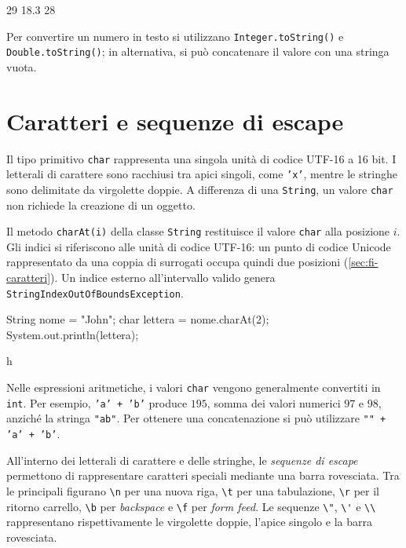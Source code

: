 \begin{unipdterminal}
29
18.3
28
\end{unipdterminal}

Per convertire un numero in testo si utilizzano
\texttt{Integer.toString()} e
\texttt{Double.toString()}; in alternativa,
si può concatenare il valore con una stringa vuota.

\clearpage

\section{Caratteri e sequenze di escape}
\label{sec:fi-java-char-escape}

Il tipo primitivo \texttt{char} rappresenta una singola
unità di codice UTF-16 a 16 bit. I letterali di carattere
sono racchiusi tra apici singoli, come \texttt{'x'},
mentre le stringhe sono delimitate da virgolette doppie.
A differenza di una \texttt{String}, un valore
\texttt{char} non richiede la creazione di un oggetto.

Il metodo \texttt{charAt(i)} della classe \texttt{String}
restituisce il valore \texttt{char} alla posizione \(i\).
Gli indici si riferiscono alle unità di codice UTF-16: un punto di codice Unicode
rappresentato da una coppia di surrogati occupa quindi
due posizioni (\cref{sec:fi-caratteri}).
Un indice esterno all'intervallo valido genera
\texttt{StringIndexOutOfBoundsException}.

\begin{unipdcode}[language=Java]
String nome = "John";
char lettera = nome.charAt(2);
System.out.println(lettera);
\end{unipdcode}

\begin{unipdterminal}
h
\end{unipdterminal}

Nelle espressioni aritmetiche, i valori \texttt{char}
vengono generalmente convertiti in \texttt{int}.
Per esempio, \texttt{'a' + 'b'} produce \(195\),
somma dei valori numerici \(97\) e \(98\),
anziché la stringa \texttt{"ab"}. Per ottenere
una concatenazione si può utilizzare
\texttt{"" + 'a' + 'b'}.

All'interno dei letterali di carattere e delle stringhe,
le \emph{sequenze di escape} permettono di rappresentare
caratteri speciali mediante una barra rovesciata.
Tra le principali figurano \lstinline|\n| per una
nuova riga, \lstinline|\t| per una tabulazione,
\lstinline|\r| per il ritorno carrello,
\lstinline|\b| per \emph{backspace} e
\lstinline|\f| per \emph{form feed}.
Le sequenze \lstinline|\"|, \lstinline|\'| e
\lstinline|\\| rappresentano rispettivamente
le virgolette doppie, l'apice singolo e la
barra rovesciata.


